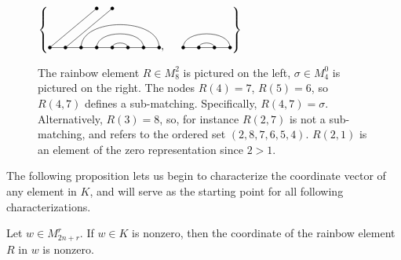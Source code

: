 \documentclass{amsart}
\begin{document}
\begin{figure} 
	\def\cbasisspacing{5mm}
	$\cbr{
		\begin{gathered}
		\GeneralizedMatching{8}{3/8, 4/7, 5/6}{2}{1/1,2/2}{5/4}, \hspace{\cbasisspacing}
		\Matching{4}{1/4, 2/3}
		\end{gathered}}$
	\caption{The rainbow element $R\in M_8^2$ is pictured on the left, $\sigma\in M_4^0$ is pictured on the right. The nodes $R(4)=7$, $R(5)=6$, so $R(4,7)$ defines a sub-matching. Specifically, $R(4,7)=\sigma$. Alternatively, $R(3)=8$, so, for instance $R(2,7)$ is not a sub-matching, and refers to the ordered set $(2,8,7,6,5,4)$. $R(2,1)$ is an element of the zero representation since $2>1$.}
	\label{sub-matching example}
\end{figure}

The following proposition lets us begin to characterize the coordinate vector of any element in $K$, and will serve as the starting point for all following characterizations.


\begin{proposition}
	Let $w\in M_{2n+r}^r$. If $w\in K$ is nonzero, then the coordinate of the rainbow element $R$ in $w$ is nonzero.
	
	\label{rainbow nonzero}
\end{proposition}	
\end{document}
